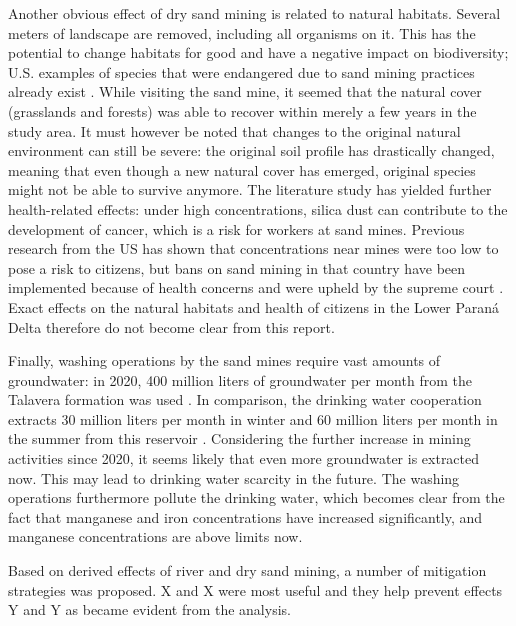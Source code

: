 Another obvious effect of dry sand mining is related to natural habitats. Several meters of landscape are removed, including all organisms on it. This has the potential to change habitats for good and have a negative impact on biodiversity; U.S. examples of species that were endangered due to sand mining practices already exist \autocite{centerforbiologicaldiversityLegalInterventionLaunched2025}. While visiting the sand mine, it seemed that the natural cover (grasslands and forests) was able to recover within merely a few years in the study area. It must however be noted that changes to the original natural environment can still be severe: the original soil profile has drastically changed, meaning that even though a new natural cover has emerged, original species might not be able to survive anymore. The literature study has yielded further health-related effects: under high concentrations, silica dust can contribute to the development of cancer, which is a risk for workers at sand mines. Previous research from the US has shown that concentrations near mines were too low to pose a risk to citizens, but bans on sand mining in that country have been implemented because of health concerns and were upheld by the supreme court \autocite{petersCommunityAirborneParticulate2017} \autocite{physiciansforsocialresponsibilityCompendiumScientificMedical2023}. Exact effects on the natural habitats and health of citizens in the Lower Paraná Delta therefore do not become clear from this report. 

Finally, washing operations by the sand mines require vast amounts of groundwater: in 2020, 400 million liters of groundwater per month from the Talavera formation was used \autocite{cauceArenasParaFracking2022}. In comparison, the drinking water cooperation extracts 30 million liters per month in winter and 60 million liters per month in the summer from this reservoir \autocite{fogliaSedArena2023}. Considering the further increase in mining activities since 2020, it seems likely that even more groundwater is extracted now. This may lead to drinking water scarcity in the future. The washing operations furthermore pollute the drinking water, which becomes clear from the fact that manganese and iron concentrations have increased significantly, and manganese concentrations are above limits now.

Based on derived effects of river and dry sand mining, a number of mitigation strategies was proposed. X and X were most useful and they help prevent effects Y and Y as became evident from the analysis.

